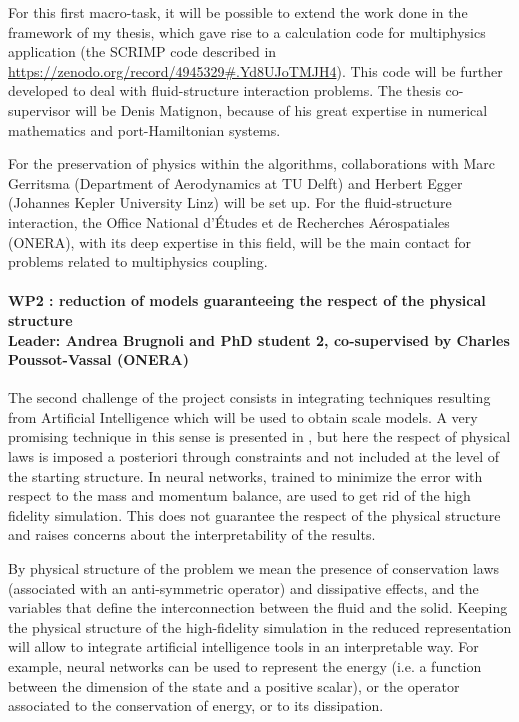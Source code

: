 \documentclass[12pt]{article}
\begin{document}
		For this first macro-task, it will be possible to extend the work done in the framework of my thesis, which gave rise to a calculation code for multiphysics application (the SCRIMP code described in \url{https://zenodo.org/record/4945329#.Yd8UJoTMJH4}). This code will be further developed to deal with fluid-structure interaction problems. The thesis co-supervisor will be Denis Matignon, because of his great expertise in numerical mathematics and port-Hamiltonian systems.
		
		For the preservation of physics within the algorithms, collaborations with Marc Gerritsma (Department of Aerodynamics at TU Delft) and Herbert Egger (Johannes Kepler University Linz) will be set up. For the fluid-structure interaction, the Office National d'Études et de Recherches Aérospatiales (ONERA), with its deep expertise in this field, will be the main contact for problems related to multiphysics coupling.
	
	\paragraph{\large WP2 : reduction of models guaranteeing the respect of the physical structure\\
		Leader: Andrea Brugnoli and PhD student 2, co-supervised by Charles Poussot-Vassal (ONERA)\\}
		
		The second challenge of the project consists in integrating techniques resulting from Artificial Intelligence
		which will be used to obtain scale models. A very promising technique in this sense is presented in \cite{lee2020}, but here the respect of physical laws is imposed a posteriori through constraints and not included at the level of the starting structure. In \cite{sun2020physics} neural networks, trained to minimize the error with respect to the mass and momentum balance, are used to get rid of the high fidelity simulation. This does not guarantee the respect of the physical structure and raises concerns about the interpretability of the results.
		
		By physical structure of the problem we mean the presence of conservation laws (associated with an anti-symmetric operator) and dissipative effects, and the variables that define the interconnection between the fluid and the solid. Keeping the physical structure of the high-fidelity simulation in the reduced representation will allow to integrate artificial intelligence tools in an interpretable way. For example, neural networks can be used to represent the energy (i.e. a function between the dimension of the state and a positive scalar), or the operator associated to the conservation of energy, or to its dissipation. 
		
\end{document}

